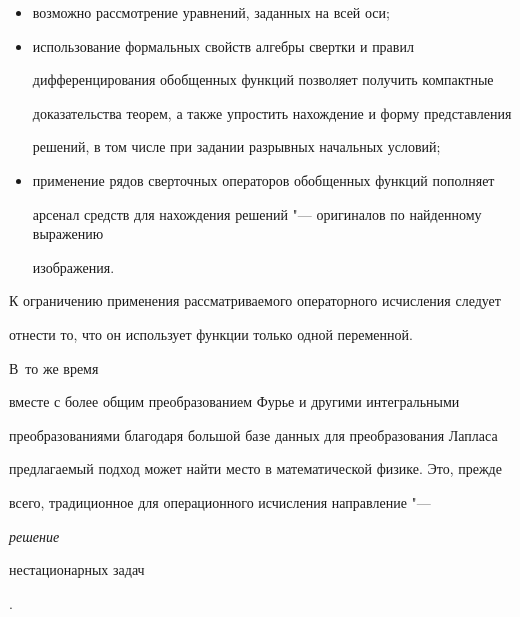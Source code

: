 \begin{itemize}

\item[1)] возможно рассмотрение уравнений, заданных на всей оси; 



\item[2)] использование формальных свойств алгебры свертки и правил 

дифференцирования обобщенных функций позволяет получить компактные 

доказательства теорем, а также упростить нахождение и форму представления 

решений, в том числе при задании разрывных начальных условий;



\item[3)] применение рядов сверточных операторов обобщенных функций пополняет 

арсенал средств для нахождения решений "--- оригиналов по найденному выражению 

изображения. 





\end{itemize}



К ограничению применения рассматриваемого операторного исчисления следует 

отнести то, что он использует функции только одной переменной. 

В~то же время 

вместе с более общим преобразованием Фурье и другими интегральными 

преобразованиями благодаря большой базе данных для преобразования Лапласа 

предлагаемый подход может найти место в математической физике. Это, прежде 

всего, традиционное для операционного исчисления направление "--- {\sl решение 

нестационарных задач}.



\smallskip









